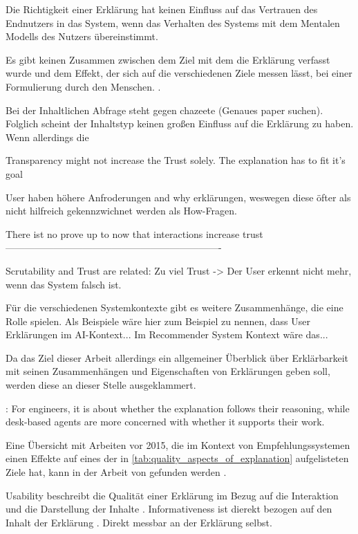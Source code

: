 Die Richtigkeit einer Erklärung hat keinen Einfluss auf das Vertrauen des Endnutzers in das System, wenn das Verhalten des Systems mit dem Mentalen Modells des Nutzers übereinstimmt. \cite{eiband_impact_2019, riveiro_thats_2021}

Es gibt keinen Zusammen zwischen dem Ziel mit dem die Erklärung verfasst wurde und dem Effekt, der sich auf die verschiedenen Ziele messen lässt, bei einer Formulierung durch den Menschen. \cite{balog_measuring_2020}.

Bei der Inhaltlichen Abfrage steht \cite{zahedi_towards_2019} gegen chazeete (Genaues paper suchen). Folglich scheint der Inhaltstyp keinen großen Einfluss auf die Erklärung zu haben. Wenn allerdings die 

Transparency might not increase the Trust solely. The explanation has to fit it's goal \cite{wiegand2019drive}

User haben höhere Anfroderungen and why erklärungen, weswegen diese öfter als nicht hilfreich gekennzwichnet werden als How-Fragen. \cite{lim_2009_assessing}

There ist no prove up to now that interactions increase trust \cite{cheng2019explaining}
-------------------------------------------------------------------

Scrutability and Trust are related: Zu viel Trust -> Der User erkennt nicht mehr, wenn das System falsch ist. \cite{gunning2019darpa}

Für die verschiedenen Systemkontexte gibt es weitere Zusammenhänge, die eine Rolle spielen. Als Beispiele wäre hier zum Beispiel zu nennen, dass User Erklärungen im AI-Kontext... Im Recommender System Kontext wäre das...

Da das Ziel dieser Arbeit allerdings ein allgemeiner Überblick über Erklärbarkeit mit seinen Zusammenhängen und Eigenschaften von Erklärungen geben soll, werden diese an dieser Stelle ausgeklammert.

\cite{martin_evaluating_2021}: For engineers, it is about whether the explanation follows their reasoning, while desk-based agents are more concerned with whether it supports their work.

Eine Übersicht mit Arbeiten vor 2015, die im Kontext von Empfehlungssystemen einen Effekte auf eines der in \autoref{tab:quality_aspects_of_explanation} aufgelisteten Ziele hat, kann in der Arbeit von \citeauthor{nunes_systematic_2017} gefunden werden \cite{nunes_systematic_2017}.

Usability beschreibt die Qualität einer Erklärung im Bezug auf die Interaktion und die Darstellung der Inhalte \cite{chazette_end-users_nodate}. Informativeness ist dierekt bezogen auf den Inhalt der Erklärung \cite{chazette_end-users_nodate}. Direkt messbar an der Erklärung selbst.